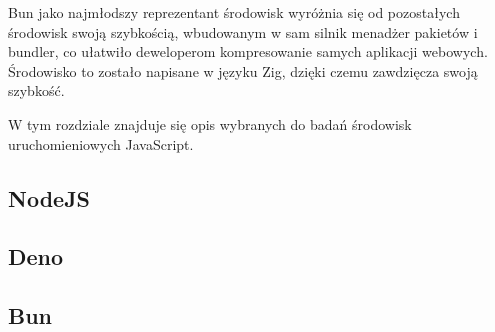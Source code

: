Bun jako najmłodszy reprezentant środowisk wyróżnia się od pozostałych środowisk swoją szybkością, wbudowanym w sam silnik menadżer pakietów i bundler, co ułatwiło deweloperom kompresowanie samych aplikacji webowych. Środowisko to zostało napisane w języku Zig, dzięki czemu zawdzięcza swoją szybkość.

W tym rozdziale znajduje się opis wybranych do badań środowisk uruchomieniowych JavaScript.

\subsection*{NodeJS}


\subsection*{Deno}

\subsection*{Bun}
